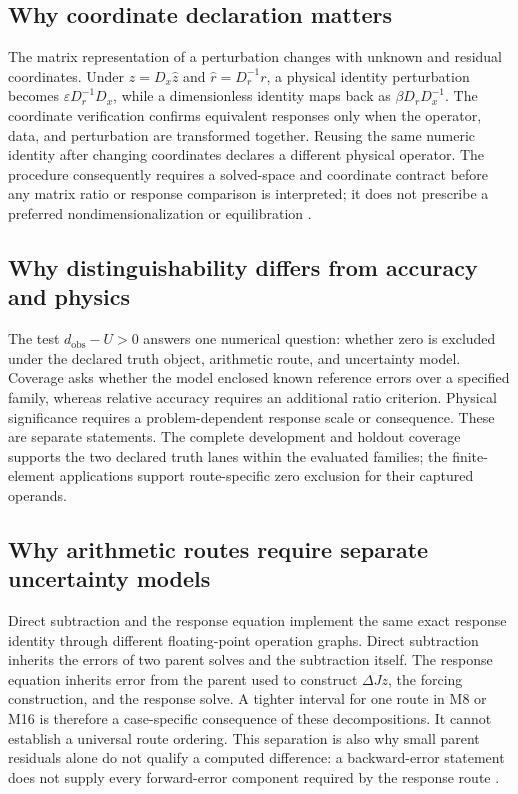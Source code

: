 \documentclass[preprint,12pt]{elsarticle}
\begin{document}
\subsection{Why coordinate declaration matters}

The matrix representation of a perturbation changes with unknown and residual coordinates. Under $z=D_x\widehat z$ and $\widehat r=D_r^{-1}r$, a physical identity perturbation becomes $\varepsilon D_r^{-1}D_x$, while a dimensionless identity maps back as $\beta D_rD_x^{-1}$. The coordinate verification confirms equivalent responses only when the operator, data, and perturbation are transformed together. Reusing the same numeric identity after changing coordinates declares a different physical operator. The procedure consequently requires a solved-space and coordinate contract before any matrix ratio or response comparison is interpreted; it does not prescribe a preferred nondimensionalization or equilibration \cite{S05,S06,S07,S08,S29}.

\subsection{Why distinguishability differs from accuracy and physics}

The test $d_{\mathrm{obs}}-U>0$ answers one numerical question: whether zero is excluded under the declared truth object, arithmetic route, and uncertainty model. Coverage asks whether the model enclosed known reference errors over a specified family, whereas relative accuracy requires an additional ratio criterion. Physical significance requires a problem-dependent response scale or consequence. These are separate statements. The complete development and holdout coverage supports the two declared truth lanes within the evaluated families; the finite-element applications support route-specific zero exclusion for their captured operands.

\subsection{Why arithmetic routes require separate uncertainty models}

Direct subtraction and the response equation implement the same exact response identity through different floating-point operation graphs. Direct subtraction inherits the errors of two parent solves and the subtraction itself. The response equation inherits error from the parent used to construct $\Delta Jz$, the forcing construction, and the response solve. A tighter interval for one route in M8 or M16 is therefore a case-specific consequence of these decompositions. It cannot establish a universal route ordering. This separation is also why small parent residuals alone do not qualify a computed difference: a backward-error statement does not supply every forward-error component required by the response route \cite{S03,S09,S10,S11}.
\end{document}
